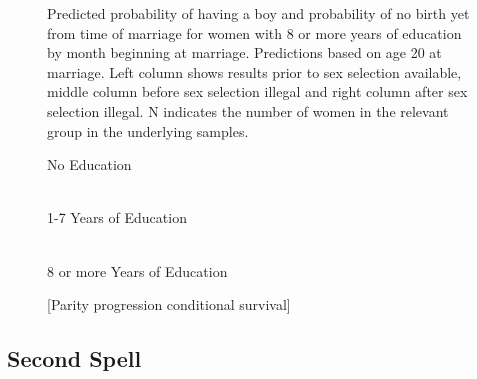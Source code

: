 \documentclass[12pt,letterpaper]{article}
\begin{document}
\begin{figure}[htpb]
{\begin{minipage}{0.31\textwidth}
\captionsetup[subfigure]{labelformat=parens}
\end{minipage}
}
\setcounter{subfigure}{3}
\caption{Predicted probability of having a boy and probability of
no birth yet from time of marriage for women with 8 or more years of education by month beginning at marriage. 
Predictions based on age 20 at marriage.
Left column shows results prior to sex selection available, middle column before
sex selection illegal and right column after sex selection illegal.
N indicates the number of women in the relevant group in the underlying samples.
}
\label{fig:results_spell1_high}
\end{figure}


\begin{figure}[htpb]
\centering
\caption*{No Education}
 \\
\caption*{1-7 Years of Education}
 \\
\caption*{8 or more Years of Education}
\caption{[Parity progression conditional survival]}
\label{fig:results_spell1_pps}
\end{figure}


\clearpage
\newpage

\subsection{Second Spell}
\end{document}
